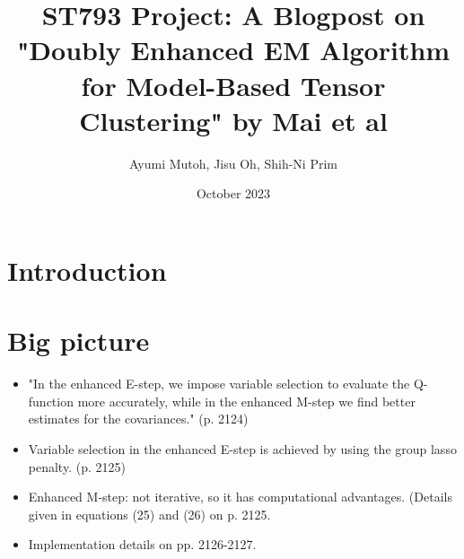 \documentclass{article}
\title{ST793 Project: A Blogpost on "Doubly Enhanced EM Algorithm for Model-Based Tensor Clustering" by Mai et al}
\author{Ayumi Mutoh, Jisu Oh, Shih-Ni Prim}
\date{October 2023}
\begin{document}
\maketitle

\section{Introduction}

\section{Big picture}
\begin{itemize}
    \item "In the enhanced E-step, we impose variable selection to evaluate the Q-function more accurately, while in the enhanced M-step we find better estimates for the covariances." (p. 2124)
    \item Variable selection in the enhanced E-step is achieved by using the group lasso penalty. (p. 2125)
    \item Enhanced M-step: not iterative, so it has computational advantages. (Details given in equations (25) and (26) on p. 2125.
    \item Implementation details on pp. 2126-2127.
\end{itemize}
\end{document}
